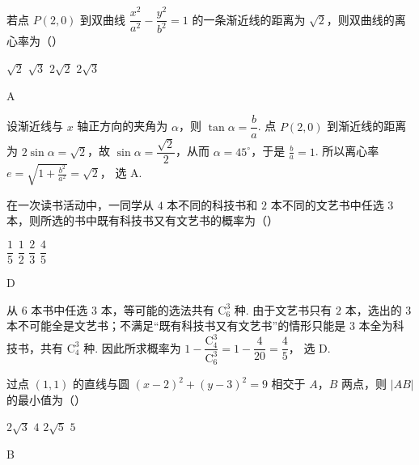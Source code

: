 \begin{problem}
若点 \(P(2,0)\) 到双曲线 \(\dfrac{x^2}{a^2}-\dfrac{y^2}{b^2}=1\) 的一条渐近线的距离为 \(\sqrt2\)，则双曲线的离心率为（\quad）


\choices
    {\(\sqrt2\)}
    {\(\sqrt3\)}
    {\(2\sqrt2\)}
    {\(2\sqrt3\)}
\end{problem}

\begin{answer}
A
\end{answer}

\begin{solution}
设渐近线与 \(x\) 轴正方向的夹角为 \(\alpha\)，则 \(\tan\alpha=\dfrac ba\). 点 \(P(2,0)\) 到渐近线的距离为 \(2\sin\alpha=\sqrt2\)，故 \(\sin\alpha=\dfrac{\sqrt2}{2}\)，从而 \(\alpha=45^\circ\)，于是 \(\frac{b}{a}=1\). 所以离心率
\(e=\sqrt{1+\frac{b^2}{a^2}}=\sqrt2\)，
选 A.
\end{solution}

\begin{problem}
在一次读书活动中，一同学从 \(4\) 本不同的科技书和 \(2\) 本不同的文艺书中任选 \(3\) 本，则所选的书中既有科技书又有文艺书的概率为（\quad）

\choices
    {\(\dfrac15\)}
    {\(\dfrac12\)}
    {\(\dfrac23\)}
    {\(\dfrac45\)}
\end{problem}

\begin{answer}
D
\end{answer}

\begin{solution}
从 \(6\) 本书中任选 \(3\) 本，等可能的选法共有 \(\mathrm C_6^3\) 种. 由于文艺书只有 \(2\) 本，选出的 \(3\) 本不可能全是文艺书；不满足“既有科技书又有文艺书”的情形只能是 \(3\) 本全为科技书，共有 \(\mathrm C_4^3\) 种. 因此所求概率为
\(1-\dfrac{\mathrm C_4^3}{\mathrm C_6^3}=1-\dfrac4{20}=\dfrac45\)，
选 D.
\end{solution}

\begin{problem}
过点 \((1,1)\) 的直线与圆 \((x-2)^2+(y-3)^2=9\) 相交于 \(A\)，\(B\) 两点，则 \(|AB|\) 的最小值为（\quad）

\choices
    {\(2\sqrt3\)}
    {\(4\)}
    {\(2\sqrt5\)}
    {\(5\)}
\end{problem}

\begin{answer}
B
\end{answer}

